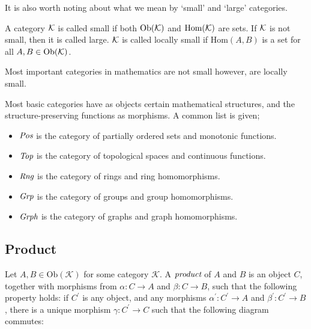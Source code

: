 \documentclass[10pt, oneside, reqno]{amsart}
\begin{document}
It is also worth noting about what we mean by `small' and `large' categories.

\begin{defn}
	A category $\mathcal{K}$ is called small if both $\text{Ob}(\mathcal{K})$ and $\text{Hom}(\mathcal{K})$ are sets.
	If $\mathcal{K}$ is not small, then it is called large.
	$\mathcal{K}$ is called locally small if $\text{Hom}(A,B)$ is a set for all $A, B \in \text{Ob}(\mathcal{K})$.
\end{defn}

\begin{rem}
	Most important categories in mathematics are not small however, are locally small.
\end{rem}

Most basic categories have as objects certain mathematical structures, and the structure-preserving
functions as morphisms. A common list is given;
\begin{itemize}
\item $\emph{Pos}$ is the category of partially ordered sets and monotonic functions.
\item $\emph{Top}$ is the category of topological spaces and continuous functions.
\item $\emph{Rng}$ is the category of rings and ring homomorphisms.
\item $\emph{Grp}$ is the category of groups and group homomorphisms.
\item $\emph{Grph}$ is the category of graphs and graph homomorphisms.
\end{itemize}

\subsection{Product} %
\label{subsec:product}
Let $A,B \in \text{Ob}(\mathcal{K})$ for some category $\mathcal{K}$.
A $\emph{product}$ of $A$ and $B$ is an object $C$, together with morphisms from
$\alpha: C \to A$ and $\beta: C \to B$, such that the following property holds:
if $C^{'}$ is any object, and any morphisms $\alpha^{'}: C^{'} \to A$ and $\beta^{'}: C^{'} \to B$,
there is a unique morphism $\gamma: C^{'} \to C$ such that the following diagram commutes:

\end{document}
